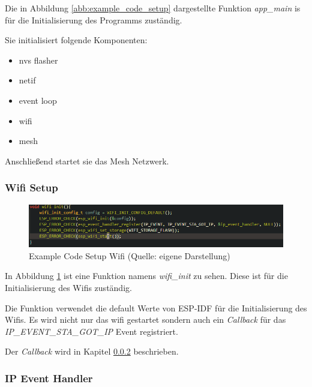 Die in Abbildung \ref{abb:example_code_setup} dargestellte Funktion \textit{app\_main} is für die Initialisierung des Programms zuständig.

Sie initialisiert folgende Komponenten:

\begin{itemize}
    \item nvs flasher
    \item netif
    \item event loop
    \item wifi
    \item mesh
\end{itemize}

Anschließend startet sie das Mesh Netzwerk.

\subsubsection{Wifi Setup}

\begin{figure}[H]
    \begin{center}
        \includegraphics[scale=0.8]{images/example_code_setup_wifi.png}
        \caption{Example Code Setup Wifi (Quelle: eigene Darstellung)}
        \label{abb:example_code_setup_wifi}
    \end{center}
\end{figure}

In Abbildung \ref{abb:example_code_setup_wifi} ist eine Funktion namens \textit{wifi\_init} zu sehen. Diese ist für die Initialisierung des Wifis zuständig.

Die Funktion verwendet die default Werte von ESP-IDF für die Initialisierung des Wifis.
Es wird nicht nur das wifi gestartet sondern auch ein \textit{Callback} für das \textit{IP\_EVENT\_STA\_GOT\_IP} Event registriert.

Der \textit{Callback} wird in Kapitel \ref{sec:example-code-event-handler} beschrieben.

\subsubsection{IP Event Handler}\label{sec:example-code-event-handler}

